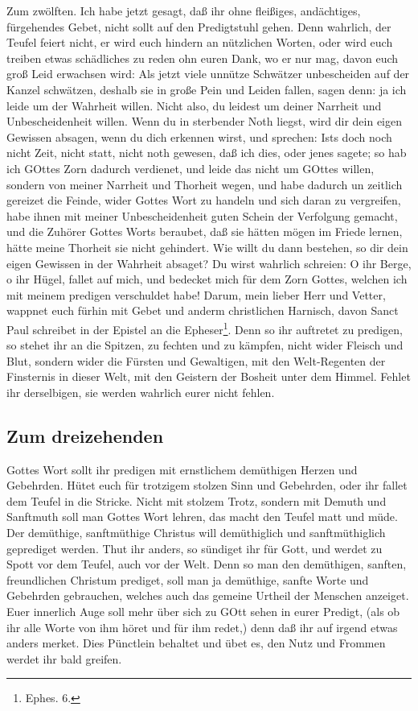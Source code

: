 Zum zwölften. Ich habe jetzt gesagt, daß ihr ohne fleißiges, andächtiges, fürgehendes Gebet, nicht sollt auf den Predigtstuhl gehen. Denn wahrlich, der Teufel feiert nicht, er wird euch hindern an nützlichen Worten, oder wird euch treiben etwas schädliches zu reden ohn euren Dank, wo er nur mag, davon euch groß Leid erwachsen wird: Als jetzt viele unnütze Schwätzer unbescheiden auf der Kanzel schwätzen, deshalb sie in große Pein und Leiden fallen, sagen denn: ja ich leide um der Wahrheit willen. Nicht also, du leidest um deiner Narrheit und Unbescheidenheit willen. Wenn du in sterbender Noth liegst, wird dir dein eigen Gewissen absagen, wenn du dich erkennen wirst, und sprechen: Ists doch noch nicht Zeit, nicht statt, nicht noth gewesen, daß ich dies, oder jenes sagete; so hab ich GOttes Zorn dadurch verdienet, und leide das nicht um GOttes willen, sondern von meiner Narrheit und Thorheit wegen, und habe dadurch un%
zeitlich gereizet die Feinde, wider Gottes Wort zu handeln und sich daran zu vergreifen, habe ihnen mit meiner Unbescheidenheit guten Schein der Verfolgung gemacht, und die Zuhörer Gottes Worts beraubet, daß sie hätten mögen im Friede lernen, hätte meine Thorheit sie nicht gehindert. Wie willt du dann bestehen, so dir dein eigen Gewissen in der Wahrheit absaget? Du wirst wahrlich schreien: O ihr Berge, o ihr Hügel, fallet auf mich, und bedecket mich für dem Zorn Gottes, welchen ich mit meinem predigen verschuldet habe! Darum, mein lieber Herr und Vetter, wappnet euch fürhin mit Gebet und anderm christlichen Harnisch, davon Sanct Paul schreibet in der Epistel an die Epheser\footnote{Ephes. 6.}. Denn so ihr auftretet zu predigen, so stehet ihr an die Spitzen, zu fechten und zu kämpfen, nicht wider Fleisch und Blut, sondern wider die Fürsten und Gewaltigen, mit den Welt-Regenten der Finsternis in dieser Welt, mit den Geistern der Bosheit unter dem Himmel. Fehlet ihr derselbigen, sie werden wahrlich eurer nicht fehlen.

\subsection{Zum dreizehenden}
%

Gottes Wort sollt ihr predigen mit ernstlichem demüthigen Herzen und Gebehrden. Hütet euch für trotzigem stolzen Sinn und Gebehrden, oder ihr fallet dem Teufel in die Stricke. Nicht mit stolzem Trotz, sondern mit Demuth und Sanftmuth soll man Gottes Wort lehren, das macht den Teufel matt und müde. Der demüthige, sanftmüthige Christus will demüthiglich und sanftmüthiglich geprediget werden. Thut ihr anders, so sündiget ihr für Gott, und werdet zu Spott vor dem Teufel, auch vor der Welt. Denn so man den demüthigen, sanften, freundlichen Christum prediget, soll man ja demüthige, sanfte Worte und Gebehrden gebrauchen, welches auch das gemeine Urtheil der Menschen anzeiget. Euer innerlich
Auge soll mehr über sich zu GOtt sehen in eurer Predigt, (als ob ihr alle Worte von ihm höret und für ihm redet,) denn daß ihr auf irgend etwas anders merket. Dies Pünctlein behaltet und übet es, den Nutz und Frommen werdet ihr bald greifen.

